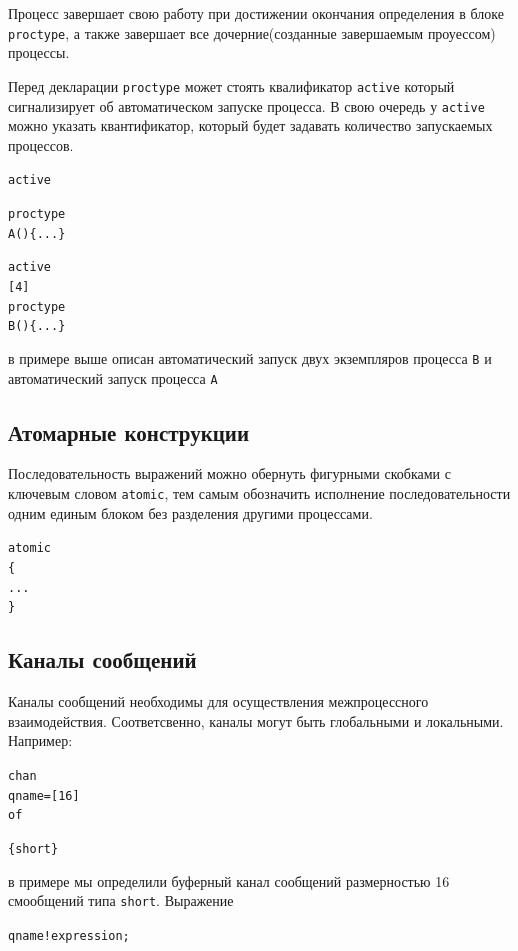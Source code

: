 \documentclass[12pt, twoside]{report}
\newcommand{\cname}[1] {
\textcolor{atnotation}{#1}
}
\begin{document}
Процесс завершает свою работу при достижении окончания определения в блоке \texttt{proctype}, а также завершает
все дочерние(созданные завершаемым проуессом) процессы.

Перед декларации \texttt{proctype} может стоять квалификатор \texttt{active} который сигнализирует
об автоматическом запуске процесса. В свою очередь у \texttt{active} можно указать квантификатор,
который будет задавать количество запускаемых процессов.

\begin{alltt}
\cname{active} \cname{proctype} A() \{ ... \}
\cname{active} [4] \cname{proctype} B() \{ ... \}
\end{alltt}
в примере выше описан автоматический запуск двух экземпляров процесса \texttt{B}
и автоматический запуск процесса \texttt{A}

\subsection*{Атомарные конструкции}\label{promela_language_ATOMIC}

Последовательность выражений можно обернуть фигурными скобками с ключевым словом \texttt{atomic},
тем самым обозначить исполнение последовательности одним единым блоком без разделения другими процессами.

\begin{alltt}
\cname{atomic} \{
  ...
\}
\end{alltt}


\subsection*{Каналы сообщений}\label{promela_language_CHAN}

Каналы сообщений необходимы для осуществления межпроцессного взаимодействия.
Соответсвенно, каналы могут быть глобальными и локальными. Например:

\begin{alltt}
\cname{chan} qname = [16] \cname{of} \cname{\{short\}}
\end{alltt}

в примере мы определили буферный канал сообщений размерностью 16 смообщений типа
\texttt{short}. Выражение

\begin{alltt}
qname ! expression;
\end{alltt}
\end{document}
